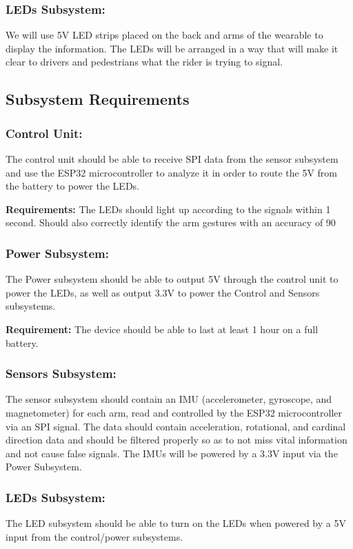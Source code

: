 \documentclass[12pt]{article}
\begin{document}
    \subsubsection{LEDs Subsystem:} 
    We will use 5V LED strips placed on the back and arms of the 
    wearable to display the information. The LEDs will be arranged 
    in a way that will make it clear to drivers and pedestrians
     what the rider is trying to signal.


\subsection{Subsystem Requirements}

\subsubsection{Control Unit:} 
The control unit should be able to receive SPI data from the 
sensor subsystem and use the ESP32 microcontroller to analyze 
it in order to route the 5V from the battery to power the LEDs. 

\textbf{Requirements:} The LEDs should light up according to the signals within 1 second.
Should also correctly identify the arm gestures with an accuracy of 90%

\subsubsection{Power Subsystem:} 
The Power subsystem should be able to output 5V through the control unit to power the LEDs, as well as output 3.3V to power the Control and Sensors subsystems. 

\textbf{Requirement:} The device should be able to last at least 1 hour on a full battery.

\subsubsection{Sensors Subsystem:}
The sensor subsystem should contain an IMU (accelerometer, gyroscope, and magnetometer) for each arm, read and controlled by the ESP32 microcontroller via an SPI signal. The data should contain acceleration, rotational, and cardinal direction data and should be filtered properly so as to not miss vital information and not cause false signals. The IMUs will be powered by a 3.3V input via the Power Subsystem.

\subsubsection{LEDs Subsystem:} 
The LED subsystem should be able to turn on the LEDs when powered by a 5V input from the control/power subsystems.
\end{document}
